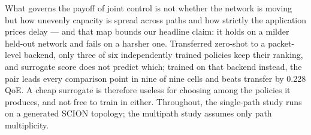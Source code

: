 What governs the payoff of joint control is not whether the network is moving but how unevenly capacity
is spread across paths and how strictly the application prices delay --- and that map bounds our
headline claim: it holds on a milder held-out network and fails on a harsher one. Transferred zero-shot
to a packet-level backend, only three of six independently trained policies keep their ranking, and
surrogate score does not predict which; trained on that backend instead, the pair leads every
comparison point in nine of nine cells and beats transfer by 0.228 QoE. A cheap surrogate is therefore
useless for choosing among the policies it produces, and not free to train in either. Throughout, the
single-path study runs on a generated SCION topology; the multipath study assumes only path
multiplicity.
